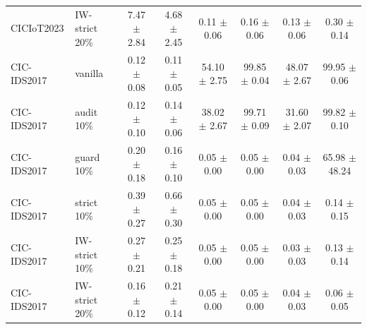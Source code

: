 \begin{table}[t]
\begin{tabular}{llcccccc}
CICIoT2023 & IW-strict 20\% & 7.47 $\pm$ 2.84 & 4.68 $\pm$ 2.45 & 0.11 $\pm$ 0.06 & 0.16 $\pm$ 0.06 & 0.13 $\pm$ 0.06 & 0.30 $\pm$ 0.14 \\
CIC-IDS2017 & vanilla & 0.12 $\pm$ 0.08 & 0.11 $\pm$ 0.05 & 54.10 $\pm$ 2.75 & 99.85 $\pm$ 0.04 & 48.07 $\pm$ 2.67 & 99.95 $\pm$ 0.06 \\
CIC-IDS2017 & audit 10\% & 0.12 $\pm$ 0.10 & 0.14 $\pm$ 0.06 & 38.02 $\pm$ 2.67 & 99.71 $\pm$ 0.09 & 31.60 $\pm$ 2.07 & 99.82 $\pm$ 0.10 \\
CIC-IDS2017 & guard 10\% & 0.20 $\pm$ 0.18 & 0.16 $\pm$ 0.10 & 0.05 $\pm$ 0.00 & 0.05 $\pm$ 0.00 & 0.04 $\pm$ 0.03 & 65.98 $\pm$ 48.24 \\
CIC-IDS2017 & strict 10\% & 0.39 $\pm$ 0.27 & 0.66 $\pm$ 0.30 & 0.05 $\pm$ 0.00 & 0.05 $\pm$ 0.00 & 0.04 $\pm$ 0.03 & 0.14 $\pm$ 0.15 \\
CIC-IDS2017 & IW-strict 10\% & 0.27 $\pm$ 0.21 & 0.25 $\pm$ 0.18 & 0.05 $\pm$ 0.00 & 0.05 $\pm$ 0.00 & 0.03 $\pm$ 0.03 & 0.13 $\pm$ 0.14 \\
CIC-IDS2017 & IW-strict 20\% & 0.16 $\pm$ 0.12 & 0.21 $\pm$ 0.14 & 0.05 $\pm$ 0.00 & 0.05 $\pm$ 0.00 & 0.04 $\pm$ 0.03 & 0.06 $\pm$ 0.05 \\
\bottomrule
\end{tabular}
\end{table}
